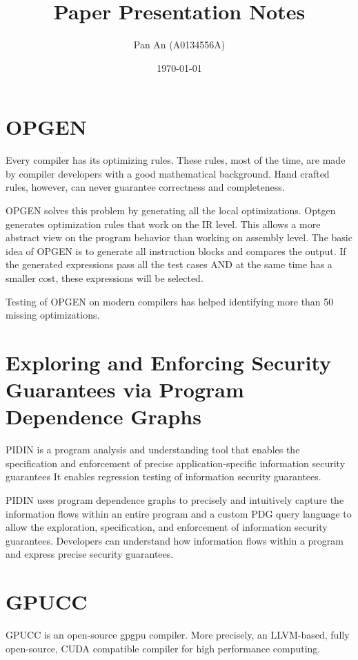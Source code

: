 \documentclass[11pt]{article}
\author{Pan An (A0134556A)}
\date{\today}
\title{Paper Presentation Notes}
\begin{document}
\maketitle
\tableofcontents

\section{OPGEN}
\label{sec:orgheadline1}
Every compiler has its optimizing rules. These rules, most of the time, are made by compiler developers with a good mathematical background. 
Hand crafted rules, however, can never guarantee correctness and completeness. 

OPGEN solves this problem by generating all the local optimizations. Optgen generates optimization rules that work on the IR level. 
This allows a more abstract view on the program behavior than working on assembly level. The basic idea
of OPGEN is to generate all instruction blocks and compares the output. If the generated expressions pass all the test cases AND
at the same time has a smaller cost, these expressions will be selected. 

Testing of OPGEN on modern compilers has helped identifying more than 50 missing optimizations.
\section{Exploring and Enforcing Security Guarantees via Program Dependence Graphs}
\label{sec:orgheadline2}

PIDIN is a program analysis and understanding tool that enables the specification and enforcement of precise application-specific information security guarantees
It enables regression testing of information security guarantees.

PIDIN uses program dependence graphs to precisely and intuitively capture the information
flows within an entire program and a custom PDG query language to
allow the exploration, specification, and enforcement of information security guarantees. 
Developers can understand how information flows within a program and express precise security guarantees.
\section{GPUCC}
\label{sec:orgheadline3}

 GPUCC is an open-source gpgpu compiler. More precisely, an LLVM-based, fully open-source, 
CUDA compatible compiler for high performance computing.
\end{document}
